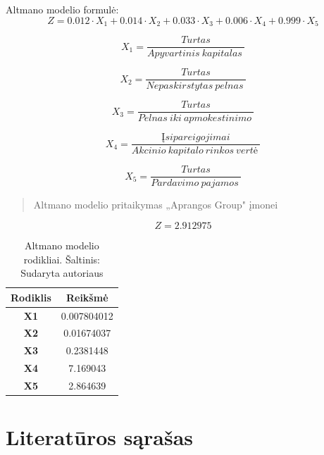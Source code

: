 \documentclass[12pt]{article}
\begin{document}
Altmano modelio formulė:
\begin{equation}
Z = 0.012 · X_1 + 0.014 · X_2 + 0.033 · X_3 + 0.006 · X_4 + 0.999 · X_5
\end{equation}

\begin{equation}
X_1 = \frac{Turtas}{Apyvartinis \ kapitalas \ }
\end{equation}

\begin{equation}
X_2 = \frac{Turtas}{Nepaskirstytas \ pelnas \ }
\end{equation}

\begin{equation}
X_3 = \frac{Turtas}{Pelnas \ iki \ apmokestinimo \ }
\end{equation}

\begin{equation}
X_4 = \frac{ Įsipareigojimai}{Akcinio \ kapitalo \ rinkos \ vertė \ }
\end{equation}

\begin{equation}
X_5 = \frac{Turtas}{Pardavimo \ pajamos \ }
\end{equation}

\begin{quote}
\center
Altmano modelio pritaikymas „Aprangos Group" įmonei
\end{quote}

\begin{equation}
Z =2.912975
\end{equation}

\begin{table}[H]
\captionsetup{justification=centering}
\centering
\begin{tabular}{|c|c|}
\hline
\textbf{Rodiklis} & \textbf{Reikšmė} \\ \hline
\textbf{X1}       & 0.007804012      \\ \hline
\textbf{X2}       & 0.01674037       \\ \hline
\textbf{X3}       & 0.2381448        \\ \hline
\textbf{X4}       & 7.169043         \\ \hline
\textbf{X5}       & 2.864639         \\ \hline
\end{tabular}
\caption{Altmano modelio rodikliai.
Šaltinis: Sudaryta autoriaus}
\end{table}
\newpage
\section{Literatūros sąrašas}

\nocite{*}
\printbibliography[title={Naudota literatūra}]
\end{document}
